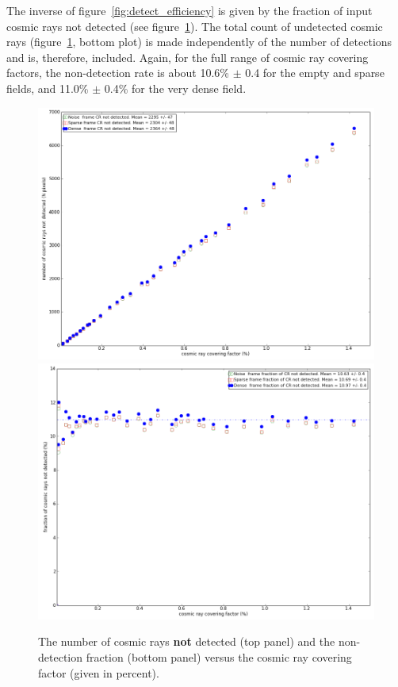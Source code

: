 The inverse of figure~\ref{fig:detect_efficiency} is given by the fraction of input cosmic rays not detected (see figure~\ref{fig:not_detected}). 
The total count of undetected cosmic rays (figure~\ref{fig:not_detected}, bottom plot) is made independently of the number of detections and is,
therefore, included. Again, for the full range of cosmic ray covering factors, the non-detection rate is about 10.6\% $\pm$ 0.4 for the empty and sparse fields, 
and 11.0\% $\pm$ 0.4\% for the very dense field.

\begin{figure}[b]
 \subfigure
\centering
\includegraphics[width=12cm]{figures/LACosmic_not_detA.png} 
\includegraphics[width=12cm]{figures/LACosmic_not_detB.png}
\caption[]
	{\footnotesize  The number of cosmic rays {\bf not} detected (top panel) and the non-detection fraction (bottom panel) versus the cosmic ray covering factor
	(given in percent).
	}
	\label{fig:not_detected}
\end{figure}


